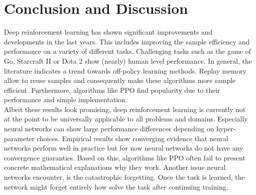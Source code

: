     \section{Conclusion and Discussion \label{sec:discussion}}
    Deep reinforcement learning has shown significant improvements and developments in the last years. 
    This includes improving the sample efficiency and performance on a variety of different tasks. 
    Challenging tasks such as the game of Go, Starcraft II or Dota 2 show (nearly) human level performance.
    In general, the literature indicates a trend towards off-policy learning methods.
    Replay memory allow to reuse samples and consequently make these algorithms more sample efficient.
    Furthermore, algorithms like PPO find popularity due to their performance and simple  implementation.\\
    Albeit these results look promising, deep reinforcement learning is currently not at the point to be universally applicable to all problems and domains. 
    Especially neural networks can show large performance differences depending on hyper-parameter choices. 
    Empirical results show converging evidence that neural networks perform well in practice but for now neural networks do not have any convergence guaranties.
    Based on this, algorithms like PPO often fail to present concrete mathematical explanations why they work.
	Another issue neural networks encounter, is the catastrophic forgetting.
	Once the task is learned, the network might forget entirely how solve the task after continuing training. 

    




